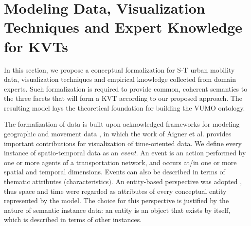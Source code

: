 \documentclass[]{interact}
\theoremstyle{plain}%
\theoremstyle{definition}
\theoremstyle{remark}
\theoremstyle{definition}
\begin{document}
\section{Modeling Data, Visualization Techniques and Expert Knowledge for KVTs}
\label{sec:modelling}

In this section, we propose a conceptual formalization for S-T urban mobility data, visualization techniques and empirical knowledge collected from domain experts. Such formalization is required to provide common, coherent semantics to the three facets that will form a KVT according to our proposed approach. The resulting model lays the theoretical foundation for building the VUMO ontology.


The formalization of data is built upon acknowledged frameworks for modeling geographic and movement data \citep{Aigner2011,EDA,Chrisman1997,Peuquet2002}, in which the work of Aigner et al. provides important contributions for visualization of time-oriented data. We define every instance of spatio-temporal data as an \emph{event}. An event is an action performed by one or more agents of a transportation network, and occurs at/in one or more spatial and temporal dimensions. Events can also be described in terms of thematic attributes (characteristics). An entity-based perspective was adopted \citep{EDA}, thus space and time were regarded as attributes of every conceptual entity represented by the model. The choice for this perspective is justified by the nature of semantic instance data: an entity is an object that exists by itself, which is described in terms of other instances.
\end{document}
